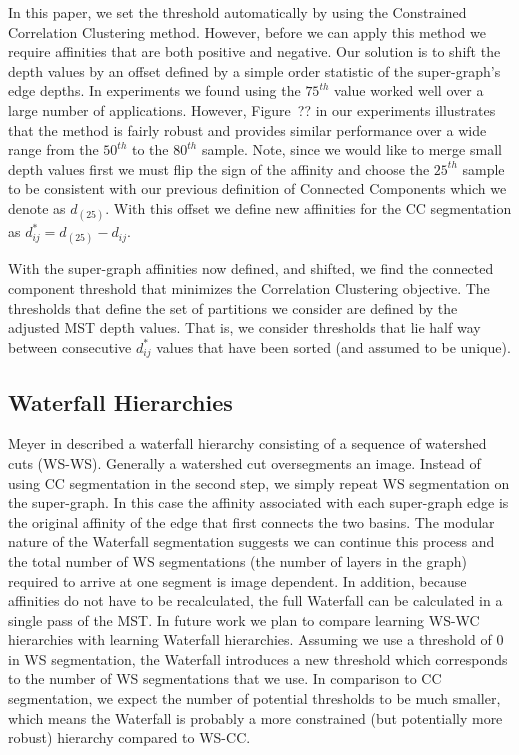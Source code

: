 \documentclass[letterpaper,twocolumn,fleqn]{article}
\begin{document}
In this paper, we set the threshold automatically by using the Constrained Correlation Clustering method. However, before we can apply this method we require affinities that are both positive and negative. Our solution is to shift the depth values by an offset defined by a simple order statistic of the super-graph's edge depths. In  experiments we  found using the $75^{th}$ value worked well over a large number of applications. However, Figure~?? in our experiments illustrates that the method is fairly robust and provides similar performance over a wide range from the $50^{th}$ to the $80^{th}$ sample. Note, since we would like to merge small depth values first we must flip the sign of the affinity and choose the $25^{th}$ sample to be consistent with our previous definition of Connected Components which we denote as $d_{(25)}$. With this offset we define new affinities for the CC segmentation as $d^{*}_{ij}=d_{(25)}-d_{ij}$.

With the super-graph affinities now defined, and shifted, we find the connected component threshold that minimizes the Correlation Clustering objective. The thresholds that define the set of partitions we consider are defined by the adjusted MST depth values. That is, we consider thresholds that lie half way between consecutive $d^{*}_{ij}$ values that have been sorted (and assumed to be unique). 

\subsection{Waterfall Hierarchies}
 Meyer in \cite{Meyer2015} described a waterfall hierarchy consisting of a sequence of watershed cuts (WS-WS).  Generally  a watershed cut oversegments an image. Instead of using CC segmentation in the second step, we simply repeat WS segmentation on the super-graph. In this case the affinity associated with each super-graph edge is the original affinity of the edge that first connects the two basins. The modular nature of the Waterfall segmentation suggests we can continue this process and the total number of WS segmentations (the number of layers in the graph) required to arrive at one segment is image dependent. In addition, because affinities do not have to be recalculated, the full Waterfall can be calculated in a single pass of the MST. In future work we plan to compare learning WS-WC hierarchies with learning Waterfall hierarchies. Assuming we use a threshold of $0$ in WS segmentation, the Waterfall introduces a new threshold which corresponds to the number of WS segmentations that we use. In comparison to CC segmentation, we expect the number of potential thresholds to be much smaller, which means the Waterfall is probably a more constrained (but potentially more robust) hierarchy compared to WS-CC. 
 
\end{document}
